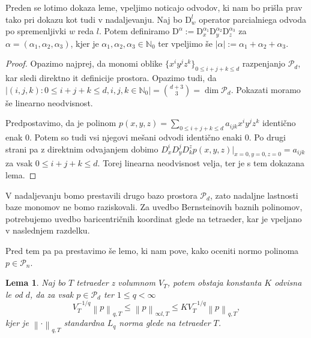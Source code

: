 \documentclass[11pt,a4paper]{article}
\newtheorem{lemma}{Lema}
\begin{document}
Preden se lotimo dokaza leme, vpeljimo noticajo odvodov, 
ki nam bo prišla prav tako pri dokazu kot tudi 
v nadaljevanju. Naj bo $\text{D}^l_w$ operator parcialniega odvoda po
spremenljivki $w$ reda $l$. Potem definiramo 
$\text{D}^\alpha := \text{D}^{\alpha_1}_x \text{D}^{\alpha_2}_y \text{D}^{\alpha_3}_z$
za $\alpha = \left(\alpha_1 , \alpha_2 , \alpha_3 \right)$,
kjer je $\alpha_1,\alpha_2, \alpha_3 \in \mathbb{N}_0$ 
ter vpeljimo še $|\alpha| := \alpha_1 + \alpha_2 + \alpha_3$.

\begin{proof}
    Opazimo najprej, da monomi oblike $\{x^i y^j z^k\}_{0 \le i  + j + k \le d}$
    razpenjanjo $\mathcal{P}_d$, kar sledi direktno it definicije 
    prostora. Opazimo tudi, da 
    $|\left(i, j , k\right): 0\le i+j+k \le d , i,j,k \in \mathbb{N}_0| = \binom{d+3}{3} = \dim\mathcal{P}_d$.
    Pokazati moramo še linearno neodvisnost.  

    Predpostavimo, da je polinom $p(x,y,z) =\sum_{0 \le i  + j + k \le d} a_{ijk} x^i y^j z^k $
    identično enak 0. Potem so tudi vsi njegovi mešani odvodi identično enaki 0.
    Po drugi strani pa z direktnim odvajanjem dobimo
    $D^i_xD^j_yD^z_k p(x,y,z)|_{x =0 ,y =0, z = 0} = a_{ijk}$ za vsak 
    $0 \le i  + j + k \le d$. Torej linearna neodvisnost velja, ter
    je s tem dokazana lema.
\end{proof}

V nadaljevanju bomo prestavili drugo bazo prostora $\mathcal{P}_d$, zato 
nadaljne lastnosti baze monomov ne bomo raziskovali. Za uvedbo Bernsteinovih
baznih polinomov, potrebujemo uvedbo baricentričnih koordinat glede na 
tetraeder, kar je vpeljano v naslednjem razdelku.

Pred tem pa pa prestavimo še lemo, ki nam pove, kako oceniti 
normo polinoma $p \in \mathcal{P}_n$.

\begin{lemma}\label{lema_norma}
    Naj bo $T$ tetraeder z volumnom $V_T$, potem obstaja 
    konstanta $K$ odvisna le od $d$, da za vsak  $p \in \mathcal{P}_d$ ter $1 \le q < \infty$
    \begin{equation}
        V_T^{-1/q} \left\lVert p \right\rVert_{q,T} \le  \left\lVert p \right\rVert_{\infty l, T} \le K V_T^{-1/q} \left\lVert p \right\rVert_{q,T},
    \end{equation}
    kjer je $\left\lVert \cdot{} \right\rVert_{q,T}$ standardna $L_q$ norma 
    glede na tetraeder $T$.
\end{lemma}
\end{document}
